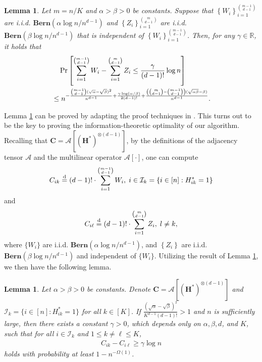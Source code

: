 \documentclass{article}
\theoremstyle{plain}
\newtheorem{lemma}[theorem]{Lemma}
\theoremstyle{definition}
\theoremstyle{remark}
\newcommand{\ICal}{\mathcal{I}}
\newcommand{\ACal}{\mathcal{A}}
\begin{document}
\begin{lemma}\label{lemma: difbinom}
	Let $m=n / K$ and $\alpha>\beta>0$ be constants. Suppose that $\left\{W_{i}\right\}_{i=1}^{\binom{m-1}{d-1}}$ are i.i.d. $\mathbf{Bern}(\alpha \log n / n^{d-1})$ and $\left\{Z_{i}\right\}_{i=1}^{\binom{m}{d-1}}$ are i.i.d. $\mathbf{Bern}(\beta \log n / n^{d-1})$ that is independent of $\left\{W_{i}\right\}_{i=1}^{\binom{m-1}{d-1}}$. Then, for any $\gamma \in \mathbb{R}$, it holds that
	\begin{align}
		& \quad\, {\rm Pr}\left[\sum_{i=1}^{\binom{m-1}{d-1}} W_{i}-\sum_{i=1}^{\binom{m}{d-1}} Z_{i} \leq \frac{\gamma}{(d-1)!} \log n\right] \nonumber \\
		& \leq n^{-\frac{ \binom{m-1}{d-1}(\sqrt{\alpha}-\sqrt{\beta})^{2}}{n^{d-1}}+\frac{\gamma \log (\alpha / \beta)}{2 (d-1)!} + \frac{\left( \binom{m}{d-1} - \binom{m-1}{d-1}\right) (\sqrt{\alpha \beta} - \beta)}{n^{d-1}} }.
	\end{align}
\end{lemma}
Lemma \ref{lemma: difbinom} can be proved by adapting the proof techniques in \citet[Lemma 8]{abbe2020entrywise}. This turns out to be the key to proving the information-theoretic optimality of our algorithm. Recalling that $\bm{C} = \mathcal{A}\left[(\bm{H}^*)^{\otimes (d-1)}\right]$, by the definitions of the adjacency tensor $\mathcal{A}$ and the multilinear operator $\mathcal{A}[\cdot]$, one can compute
\[
C_{ik} \overset{\textnormal{d}}{=} (d-1)! \cdot \sum_{i=1}^{\binom{m-1}{d-1}} W_i, \; i \in \ICal_k=\{i\in [n]: H_{ik}^*=1 \}
\]
and
\[
C_{i\ell} \overset{\textnormal{d}}{=} (d-1)! \cdot \sum_{i=1}^{\binom{m}{d-1}} Z_i,\; l\neq k,
\]
where $\{W_i\}$ are i.i.d. $\mathbf{Bern}(\alpha \log n / n^{d-1})$, and $\left\{Z_{i}\right\}$ are i.i.d. $\mathbf{Bern}(\beta \log n / n^{d-1})$ and independent of $\{W_i\}$. Utilizing the result of Lemma \ref{lemma: difbinom}, we then have the following lemma.

\begin{lemma}\label{lemma: ground truth}
	Let $\alpha > \beta >0$ be constants. Denote $\bm{C} = \ACal\left[(\bm{H}^*)^{\otimes (d-1)}\right]$ and $\ICal_k =\{i\in [n]: H_{ik}^*=1 \}$ for all $k\in[K]$. If $\frac{(\sqrt{\alpha} - \sqrt{\beta})^2}{K^{d-1}(d-1)!} >1$ and $n$ is sufficiently large, then there exists a constant $\gamma >0$, which depends only on $\alpha,\beta,d$, and $K$, such that for all $i \in \ICal_k$ and $1 \leq k \neq \ell \leq K$,
	\begin{align} \label{eq: cik-cil}
		C_{ik}-C_{i\ell} \geq \gamma \log n
	\end{align}
	holds with probability at least $1-n^{-\Omega(1)}$.
\end{lemma}
\end{document}

